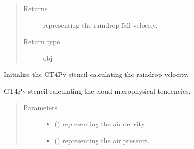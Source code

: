\documentclass[letterpaper,10pt,english]{sphinxmanual}
\begin{document}
\begin{fulllineitems}
\begin{fulllineitems}
\begin{quote}
\begin{description}
\begin{itemize}
\end{itemize}

\item[{Returns}] \leavevmode
{} representing the raindrop fall velocity.

\item[{Return type}] \leavevmode
obj

\end{description}\end{quote}

\end{fulllineitems}


\begin{fulllineitems}
\label{\detokenize{api:parameterizations.slow_tendency_microphysics_kessler_wrf.SlowTendencyMicrophysicsKesslerWRF._stencil_raindrop_fall_velocity_initialize}}
Initialize the GT4Py stencil calculating the raindrop velocity.

\end{fulllineitems}


\begin{fulllineitems}
\label{\detokenize{api:parameterizations.slow_tendency_microphysics_kessler_wrf.SlowTendencyMicrophysicsKesslerWRF._stencil_tendency_defs}}
GT4Py stencil calculating the cloud microphysical tendencies.
\begin{quote}\begin{description}
\item[{Parameters}] \leavevmode\begin{itemize}
\item {} 
 () \textendash{}  representing the air density.

\item {} 
 () \textendash{}  representing the air pressure.


\end{itemize}
\end{description}
\end{quote}
\end{fulllineitems}
\end{fulllineitems}
\end{document}
